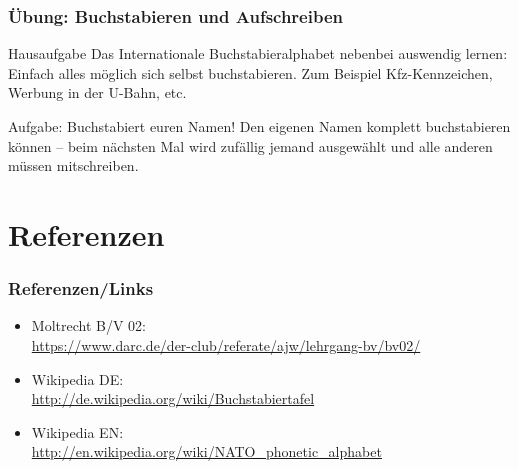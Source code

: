 \begin{frame}
  \frametitle{Übung: Buchstabieren und Aufschreiben}

  \begin{alertblock}{Hausaufgabe}
    Das Internationale Buchstabieralphabet nebenbei auswendig lernen:
    Einfach alles möglich sich selbst buchstabieren. Zum Beispiel
    Kfz-Kennzeichen, Werbung in der U-Bahn, etc.
  \end{alertblock}

  \begin{alertblock}{Aufgabe: Buchstabiert euren Namen!}
    Den eigenen Namen komplett buchstabieren können -- beim nächsten Mal
    wird zufällig jemand ausgewählt und alle anderen müssen mitschreiben.
  \end{alertblock}

\end{frame}

\section*{Referenzen}

\begin{frame}
  \frametitle{Referenzen/Links}

  \footnotesize
  \begin{itemize}
    \item Moltrecht B/V 02: \\
      \url{https://www.darc.de/der-club/referate/ajw/lehrgang-bv/bv02/}
    \item Wikipedia DE: \\
      \url{http://de.wikipedia.org/wiki/Buchstabiertafel}
    \item Wikipedia EN: \\
      \url{http://en.wikipedia.org/wiki/NATO_phonetic_alphabet}
  \end{itemize}

\end{frame}


